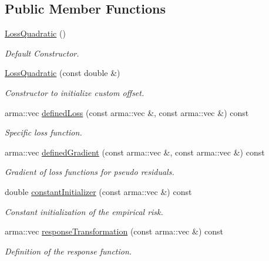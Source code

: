 \subsection*{Public Member Functions}
\begin{DoxyCompactItemize}
\item 
\mbox{\hyperlink{classloss_1_1_loss_quadratic_ae1bc457d09db2e808cf7f4f80f92730a}{Loss\+Quadratic}} ()
\begin{DoxyCompactList}\small\item\em Default Constructor. \end{DoxyCompactList}\item 
\mbox{\hyperlink{classloss_1_1_loss_quadratic_af3ac6ec45217231e7a0829c8501ccf1b}{Loss\+Quadratic}} (const double \&)
\begin{DoxyCompactList}\small\item\em Constructor to initialize custom offset. \end{DoxyCompactList}\item 
arma\+::vec \mbox{\hyperlink{classloss_1_1_loss_quadratic_a7495a0d225ae5470840e8f377419d7cf}{defined\+Loss}} (const arma\+::vec \&, const arma\+::vec \&) const
\begin{DoxyCompactList}\small\item\em Specific loss function. \end{DoxyCompactList}\item 
arma\+::vec \mbox{\hyperlink{classloss_1_1_loss_quadratic_ad8b03123e260e2f034e507fff9695604}{defined\+Gradient}} (const arma\+::vec \&, const arma\+::vec \&) const
\begin{DoxyCompactList}\small\item\em Gradient of loss functions for pseudo residuals. \end{DoxyCompactList}\item 
double \mbox{\hyperlink{classloss_1_1_loss_quadratic_a8519141a797078485d04038ad44a4592}{constant\+Initializer}} (const arma\+::vec \&) const
\begin{DoxyCompactList}\small\item\em Constant initialization of the empirical risk. \end{DoxyCompactList}\item 
arma\+::vec \mbox{\hyperlink{classloss_1_1_loss_quadratic_a2534e3ec615acd6d0c80c2dbcfb8c1e9}{response\+Transformation}} (const arma\+::vec \&) const
\begin{DoxyCompactList}\small\item\em Definition of the response function. \end{DoxyCompactList}\end{DoxyCompactItemize}
